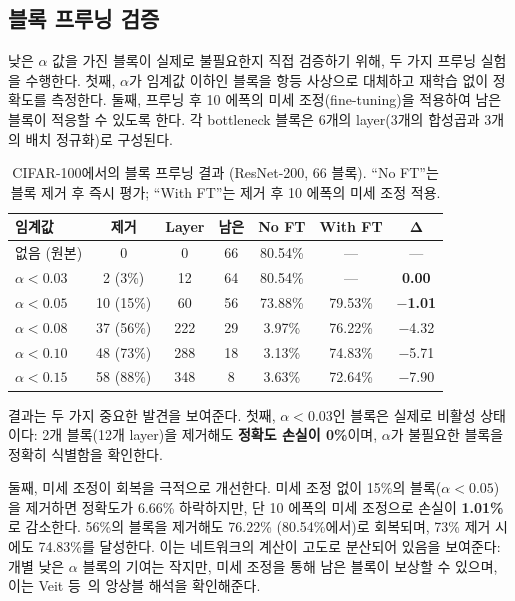 \documentclass[preprint,12pt]{elsarticle}
\begin{document}
\subsection{블록 프루닝 검증}
\label{sec:pruning}

낮은 $\alpha$ 값을 가진 블록이 실제로 불필요한지 직접 검증하기 위해, 두 가지 프루닝 실험을 수행한다. 첫째, $\alpha$가 임계값 이하인 블록을 항등 사상으로 대체하고 재학습 없이 정확도를 측정한다. 둘째, 프루닝 후 10 에폭의 미세 조정(fine-tuning)을 적용하여 남은 블록이 적응할 수 있도록 한다. 각 bottleneck 블록은 6개의 layer(3개의 합성곱과 3개의 배치 정규화)로 구성된다.

\begin{table}[t]
\centering
\caption{CIFAR-100에서의 블록 프루닝 결과 (ResNet-200, 66 블록). ``No FT''는 블록 제거 후 즉시 평가; ``With FT''는 제거 후 10 에폭의 미세 조정 적용.}
\label{tab:pruning}
\begin{tabular}{lcccccc}
\toprule
\textbf{임계값} & \textbf{제거} & \textbf{Layer} & \textbf{남은} & \textbf{No FT} & \textbf{With FT} & $\mathbf{\Delta}$ \\
\midrule
없음 (원본) & 0 & 0 & 66 & 80.54\% & --- & --- \\
$\alpha < 0.03$ & 2 (3\%) & 12 & 64 & 80.54\% & --- & \textbf{0.00} \\
$\alpha < 0.05$ & 10 (15\%) & 60 & 56 & 73.88\% & 79.53\% & \textbf{$-$1.01} \\
$\alpha < 0.08$ & 37 (56\%) & 222 & 29 & 3.97\% & 76.22\% & $-$4.32 \\
$\alpha < 0.10$ & 48 (73\%) & 288 & 18 & 3.13\% & 74.83\% & $-$5.71 \\
$\alpha < 0.15$ & 58 (88\%) & 348 & 8 & 3.63\% & 72.64\% & $-$7.90 \\
\bottomrule
\end{tabular}
\end{table}

결과는 두 가지 중요한 발견을 보여준다. 첫째, $\alpha < 0.03$인 블록은 실제로 비활성 상태이다: 2개 블록(12개 layer)을 제거해도 \textbf{정확도 손실이 0\%}이며, $\alpha$가 불필요한 블록을 정확히 식별함을 확인한다.

둘째, 미세 조정이 회복을 극적으로 개선한다. 미세 조정 없이 15\%의 블록($\alpha < 0.05$)을 제거하면 정확도가 6.66\% 하락하지만, 단 10 에폭의 미세 조정으로 손실이 \textbf{1.01\%}로 감소한다. 56\%의 블록을 제거해도 76.22\% (80.54\%에서)로 회복되며, 73\% 제거 시에도 74.83\%를 달성한다. 이는 네트워크의 계산이 고도로 분산되어 있음을 보여준다: 개별 낮은 $\alpha$ 블록의 기여는 작지만, 미세 조정을 통해 남은 블록이 보상할 수 있으며, 이는 Veit 등~\cite{veit2016residual}의 앙상블 해석을 확인해준다.
\end{document}
